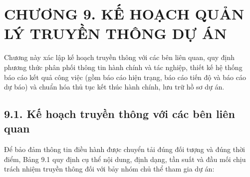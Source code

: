 \section{CHƯƠNG 9. KẾ HOẠCH QUẢN LÝ TRUYỀN THÔNG DỰ ÁN}

Chương này xác lập kế hoạch truyền thông với các bên liên quan, quy định phương thức phân phối thông tin hành chính và tác nghiệp, thiết kế hệ thống báo cáo kết quả công việc (gồm báo cáo hiện trạng, báo cáo tiến độ và báo cáo dự báo) và chuẩn hóa thủ tục kết thúc hành chính, lưu trữ hồ sơ dự án.

\subsection{9.1. Kế hoạch truyền thông với các bên liên quan}

Để bảo đảm thông tin điều hành được chuyển tải đúng đối tượng và đúng thời điểm, Bảng 9.1 quy định cụ thể nội dung, định dạng, tần suất và đầu mối chịu trách nhiệm truyền thông đối với bảy nhóm chủ thể tham gia dự án:

